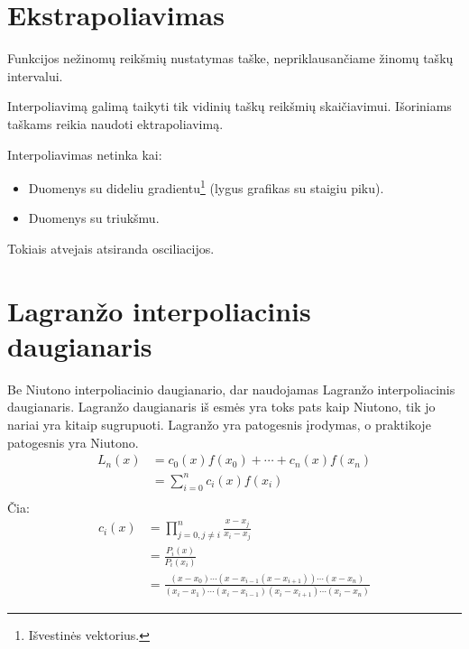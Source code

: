\section{Ekstrapoliavimas}


\begin{defn}[Ekstrapoliavimas]
  Funkcijos nežinomų reikšmių nustatymas taške, nepriklausančiame žinomų
  taškų intervalui.
\end{defn}

Interpoliavimą galimą taikyti tik vidinių taškų reikšmių
skaičiavimui. Išoriniams taškams reikia naudoti ektrapoliavimą.



Interpoliavimas netinka kai:
\begin{itemize}
  \item Duomenys su dideliu gradientu\footnote{Išvestinės vektorius.}
    (lygus grafikas su staigiu piku).
  \item Duomenys su triukšmu.
\end{itemize}
Tokiais atvejais atsiranda osciliacijos.



\section{Lagranžo interpoliacinis daugianaris}


Be Niutono interpoliacinio daugianario, dar naudojamas Lagranžo
interpoliacinis daugianaris. Lagranžo daugianaris iš esmės yra toks
pats kaip Niutono, tik jo nariai yra kitaip sugrupuoti. Lagranžo yra
patogesnis įrodymas, o praktikoje patogesnis yra Niutono.
\begin{align*}
  L_{n}(x)
    &= c_{0}(x)f(x_{0}) + \cdots + c_{n}(x)f(x_{n}) \\
    &= \sum_{i=0}^{n}c_{i}(x)f(x_{i}) \\
\end{align*}
Čia:
\begin{align*}
  c_{i}(x)
  &= \prod_{j=0,j \neq i}^{n}\frac{x-x_{j}}{x_{i}-x_{j}} \\
  &= \frac{P_{i}(x)}{P_{i}(x_{i})} \\
  &= \frac{(x-x_{0})\cdots(x-x_{i-1}(x-x_{i+1}))\cdots(x-x_{n})}
          {(x_{i}-x_{1})\cdots(x_{i}-x_{i-1})(x_{i}-x_{i+1})\cdots(x_{i}-x_{n})}
\end{align*}

